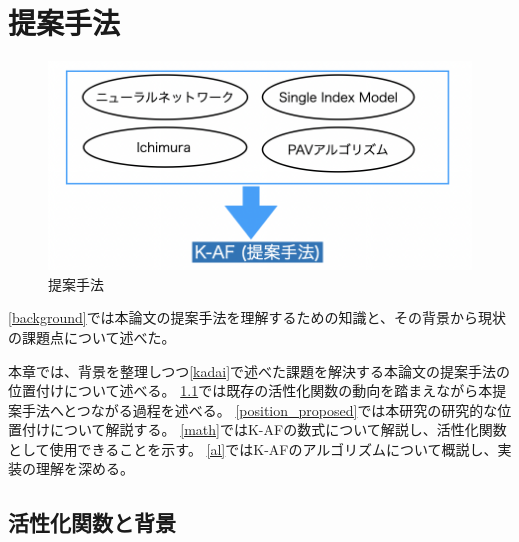 \chapter{提案手法}
\label{proposed}



\begin{figure}[hbtp]
\includegraphics[width=15cm]{asset/proposed_method.png}
	\caption{提案手法}
	\label{proposed_method}
\end{figure}


\ref{background}では本論文の提案手法を理解するための知識と、その背景から現状の課題点について述べた。

本章では、背景を整理しつつ\ref{kadai}で述べた課題を解決する本論文の提案手法の位置付けについて述べる。
\ref{history_activation}では既存の活性化関数の動向を踏まえながら本提案手法へとつながる過程を述べる。
\ref{position_proposed}では本研究の研究的な位置付けについて解説する。
\ref{math}ではK-AFの数式について解説し、活性化関数として使用できることを示す。
\ref{al}ではK-AFのアルゴリズムについて概説し、実装の理解を深める。




\section{活性化関数と背景}
\label {history_activation}


